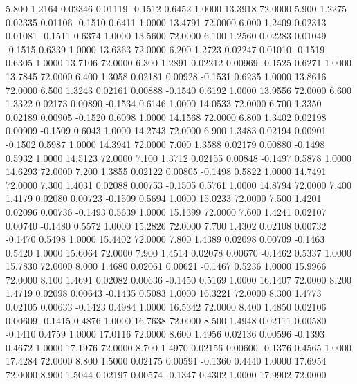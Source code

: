   5.800   1.2164   0.02346   0.01119  -0.1512   0.6452   1.0000  13.3918  72.0000
   5.900   1.2275   0.02335   0.01106  -0.1510   0.6411   1.0000  13.4791  72.0000
   6.000   1.2409   0.02313   0.01081  -0.1511   0.6374   1.0000  13.5600  72.0000
   6.100   1.2560   0.02283   0.01049  -0.1515   0.6339   1.0000  13.6363  72.0000
   6.200   1.2723   0.02247   0.01010  -0.1519   0.6305   1.0000  13.7106  72.0000
   6.300   1.2891   0.02212   0.00969  -0.1525   0.6271   1.0000  13.7845  72.0000
   6.400   1.3058   0.02181   0.00928  -0.1531   0.6235   1.0000  13.8616  72.0000
   6.500   1.3243   0.02161   0.00888  -0.1540   0.6192   1.0000  13.9556  72.0000
   6.600   1.3322   0.02173   0.00890  -0.1534   0.6146   1.0000  14.0533  72.0000
   6.700   1.3350   0.02189   0.00905  -0.1520   0.6098   1.0000  14.1568  72.0000
   6.800   1.3402   0.02198   0.00909  -0.1509   0.6043   1.0000  14.2743  72.0000
   6.900   1.3483   0.02194   0.00901  -0.1502   0.5987   1.0000  14.3941  72.0000
   7.000   1.3588   0.02179   0.00880  -0.1498   0.5932   1.0000  14.5123  72.0000
   7.100   1.3712   0.02155   0.00848  -0.1497   0.5878   1.0000  14.6293  72.0000
   7.200   1.3855   0.02122   0.00805  -0.1498   0.5822   1.0000  14.7491  72.0000
   7.300   1.4031   0.02088   0.00753  -0.1505   0.5761   1.0000  14.8794  72.0000
   7.400   1.4179   0.02080   0.00723  -0.1509   0.5694   1.0000  15.0233  72.0000
   7.500   1.4201   0.02096   0.00736  -0.1493   0.5639   1.0000  15.1399  72.0000
   7.600   1.4241   0.02107   0.00740  -0.1480   0.5572   1.0000  15.2826  72.0000
   7.700   1.4302   0.02108   0.00732  -0.1470   0.5498   1.0000  15.4402  72.0000
   7.800   1.4389   0.02098   0.00709  -0.1463   0.5420   1.0000  15.6064  72.0000
   7.900   1.4514   0.02078   0.00670  -0.1462   0.5337   1.0000  15.7830  72.0000
   8.000   1.4680   0.02061   0.00621  -0.1467   0.5236   1.0000  15.9966  72.0000
   8.100   1.4691   0.02082   0.00636  -0.1450   0.5169   1.0000  16.1407  72.0000
   8.200   1.4719   0.02098   0.00643  -0.1435   0.5083   1.0000  16.3221  72.0000
   8.300   1.4773   0.02105   0.00633  -0.1423   0.4984   1.0000  16.5342  72.0000
   8.400   1.4850   0.02106   0.00609  -0.1415   0.4876   1.0000  16.7638  72.0000
   8.500   1.4948   0.02111   0.00580  -0.1410   0.4759   1.0000  17.0116  72.0000
   8.600   1.4956   0.02136   0.00596  -0.1393   0.4672   1.0000  17.1976  72.0000
   8.700   1.4970   0.02156   0.00600  -0.1376   0.4565   1.0000  17.4284  72.0000
   8.800   1.5000   0.02175   0.00591  -0.1360   0.4440   1.0000  17.6954  72.0000
   8.900   1.5044   0.02197   0.00574  -0.1347   0.4302   1.0000  17.9902  72.0000
